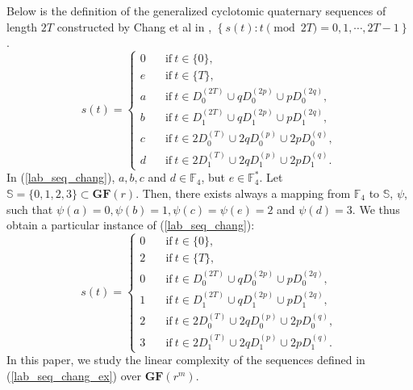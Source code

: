 \documentclass{mcom-l}
\theoremstyle{definition}
\numberwithin{equation}{section}
\begin{document}
 Below is the definition of the generalized cyclotomic quaternary sequences of length $ 2T $ constructed by Chang et al in \cite{B13}, $ \left\{ s(t):t\pmod{2T}=0,1,\cdots,2T-1\right\} $ .
   \begin{equation}\label{lab_seq_chang}
   s(t)=
   \begin{cases}
   0 &\text{if}\  t\in \lbrace 0\rbrace,\\
   e &\text{if}\  t\in \lbrace T\rbrace,\\
   a &\text{if}\  t\in D_{0}^{(2T)}\cup qD_{0}^{(2p)}\cup pD_{0}^{(2q)},\\
   b\quad &\text{if}\  t\in D_{1}^{(2T)}\cup qD_{1}^{(2p)}\cup pD_{1}^{(2q)},\\
   c &\text{if}\  t\in 2D_{0}^{(T)}\cup 2qD_{0}^{(p)}\cup 2pD_{0}^{(q)},\\
   d &\text{if}\  t\in 2D_{1}^{(T)}\cup 2qD_{1}^{(p)}\cup 2pD_{1}^{(q)}.
   \end{cases}
   \end{equation}
   In (\ref{lab_seq_chang}), $ a,b,c$ and $d\in \mathbb{F}_{4} $, but $ e\in   \mathbb{F}_{4}^{*} $. Let $ \mathbb{S} =\lbrace 0,1,2,3\rbrace \subset \mathbf{GF}(r)$. Then, there exists always a  mapping from $ \mathbb{F}_{4} $ to $ \mathbb{S}  $, $ \psi $, such that $ \psi(a)=0, \psi(b)=1,\psi(c)=\psi(e)=2$ and $ \psi(d)=3 $.  We thus obtain a particular instance of (\ref{lab_seq_chang}):
   \begin{equation}\label{lab_seq_chang_ex}
     s(t)=
     \begin{cases}
     0 &\text{if}\  t\in \lbrace 0\rbrace,\\
     2 &\text{if}\  t\in \lbrace T\rbrace,\\
     0 &\text{if}\  t\in D_{0}^{(2T)}\cup qD_{0}^{(2p)}\cup pD_{0}^{(2q)},\\
     1\quad &\text{if}\  t\in D_{1}^{(2T)}\cup qD_{1}^{(2p)}\cup pD_{1}^{(2q)},\\
     2 &\text{if}\  t\in 2D_{0}^{(T)}\cup 2qD_{0}^{(p)}\cup 2pD_{0}^{(q)},\\
     3 &\text{if}\  t\in 2D_{1}^{(T)}\cup 2qD_{1}^{(p)}\cup 2pD_{1}^{(q)}.
     \end{cases}
     \end{equation}
    In this paper, we study the linear complexity of the sequences defined in (\ref{lab_seq_chang_ex}) over $ \mathbf{GF}(r^{m}) $.
    
\end{document}
